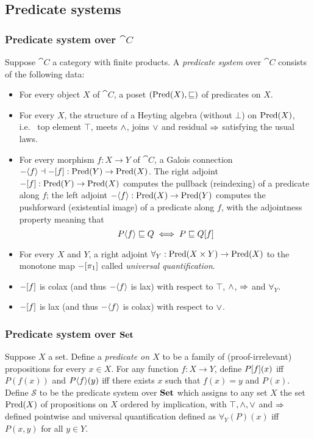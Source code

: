 \subsection{Predicate systems}
\label{sec:predicate-system}

\subsubsection{Predicate system over $\cat{C}$}

Suppose $\cat{C}$ a category with finite products. A \emph{predicate system} over $\cat{C}$ consists of the
following data:
\begin{itemize}
\item For every object $X$ of $\cat{C}$, a poset $(\mathrm{Pred}(X), \sqsubseteq)$ of predicates on $X$.
\item For every $X$, the structure of a Heyting algebra (without $\bot$) on $\mathrm{Pred}(X)$, i.e.~ top element
   $\top$, meets $\wedge$, joins $\vee$ and residual $\Rightarrow$ satisfying the usual laws.
\item For every morphism $f: X \to Y$ of $\cat{C}$, a Galois connection $-\langle f\rangle \dashv
-[f] : \mathrm{Pred}(Y) \to \mathrm{Pred}(X)$. The right adjoint $-[f]: \mathrm{Pred}(Y) \to \mathrm{Pred}(X)$ computes
the pullback (reindexing) of a predicate along $f$; the left adjoint $-\langle f\rangle: \mathrm{Pred}(X) \to
\mathrm{Pred}(Y)$ computes the pushforward (existential image) of a predicate along $f$, with the adjointness property
meaning that
\[P\langle f\rangle \sqsubseteq Q \iff P \sqsubseteq Q[f] \]
\item For every $X$ and $Y$, a right adjoint $\forall_Y: \mathrm{Pred}(X \times Y) \to \mathrm{Pred}(X)$ to the monotone map
$-[\pi_1]$ called \emph{universal quantification}. 
\item $-[f]$ is colax (and thus $-\langle f\rangle$ is lax) with respect to $\top$, $\wedge$,
$\Rightarrow$ and $\forall_Y$.
\item $-[f]$ is lax (and thus $-\langle f\rangle$ is colax) with respect to $\vee$.
\end{itemize}

\subsubsection{Predicate system over $\mathbf{Set}$}

Suppose $X$ a set. Define a \emph{predicate on $X$} to be a family of (proof-irrelevant) propositions for
every $x \in X$. For any function $f: X \to Y$, define $P[f](x)$ iff $P(f(x))$ and
$P\langle f\rangle(y)$ iff there exists $x$ such that $f(x) = y$ and $P(x)$. Define $\mathcal{S}$ to be the
predicate system over $\mathbf{Set}$ which assigns to any set $X$ the set $\mathrm{Pred}(X)$ of propositions on $X$ ordered by
implication, with $\top, \wedge, \vee$ and $\Rightarrow$ defined pointwise and universal quantification defined
as $\forall_Y(P)(x)$ iff $P(x,y)$ for all $y \in Y$.

